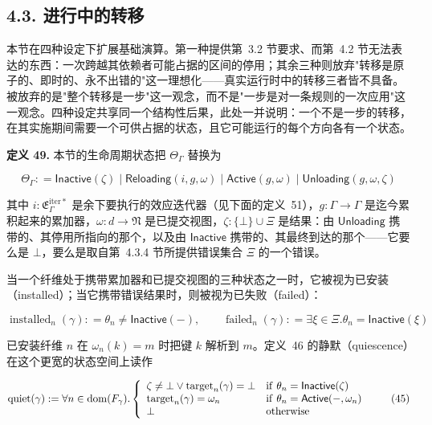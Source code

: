 \subsection{4.3. 进行中的转移}\label{transitions-in-progress}

本节在四种设定下扩展基础演算。第一种提供第~3.2 节要求、而第~4.2 节无法表达的东西：一次跨越其依赖者可能占据的区间的停用；其余三种则放弃"转移是原子的、即时的、永不出错的"这一理想化——真实运行时中的转移三者皆不具备。被放弃的是"整个转移是一步"这一观念，而不是"一步是对一条规则的一次应用"这一观念。四种设定共享同一个结构性后果，此处一并说明：一个不是一步的转移，在其实施期间需要一个可供占据的状态，且它可能运行的每个方向各有一个状态。

\textbf{定义 49.} 本节的生命周期状态把 \(\Theta _ { \Gamma }\) 替换为

\[
\Theta _ { \Gamma } : = \mathsf { I n a c t i v e } ( \zeta ) \mid \mathsf { R e l o a d i n g } ( i , g , \omega ) \mid \mathsf { A c t i v e } ( g , \omega ) \mid \mathsf { U n l o a d i n g } ( g , \omega , \zeta )\tag{43}
\]

其中 \(i : \mathfrak { E } _ { \Gamma } ^ { \mathrm { i t e r * } }\) 是余下要执行的效应迭代器（见下面的定义~51），\(g : \Gamma \to \Gamma\) 是迄今累积起来的累加器，\(\omega : d \to \mathfrak { N}\) 是已提交视图，\(\zeta : \{ \bot \} \cup \Xi\) 是结果：由 \(\mathsf { U n l o a d i n g }\) 携带的、其停用所指向的那个，以及由 \(\mathsf { I n a c t i v e }\) 携带的、其最终到达的那个——它要么是 \(\bot\)，要么是取自第~4.3.4 节所提供错误集合 \(\Xi\) 的一个错误。

当一个纤维处于携带累加器和已提交视图的三种状态之一时，它被视为已安装（installed）；当它携带错误结果时，则被视为已失败（failed）：

\[
\operatorname { i n s t a l l e d } _ { n } ( \gamma ) : = \theta _ { n } \neq \mathsf { I n a c t i v e } ( - ) , \qquad \operatorname { f a i l e d } _ { n } ( \gamma ) : = \exists \xi \in \Xi . \theta _ { n } = \mathsf { I n a c t i v e } ( \xi )\tag{44}
\]

已安装纤维 \(n\) 在 \(\omega _ { n } ( k ) = m\) 时把键 \(k\) 解析到 \(m\)。定义~46 的静默（quiescence）在这个更宽的状态空间上读作

\[
\mathrm { q u i e t } ( \gamma ) : = \forall n \in \mathrm { d o m } ( F _ { \gamma } ) . \left\{ \begin{array} { l l } { \zeta \neq \bot \vee \mathrm { t a r g e t } _ { n } ( \gamma ) = \bot } & { \mathrm { i f ~ } \theta _ { n } = \mathsf { I n a c t i v e } ( \zeta ) } \\ { \mathrm { t a r g e t } _ { n } ( \gamma ) = \omega _ { n } } & { \mathrm { i f ~ } \theta _ { n } = \mathsf { A c t i v e } ( - , \omega _ { n } ) } \\ { \bot } & { \mathrm { o t h e r w i s e } } \end{array} \right.\tag{45}
\]

